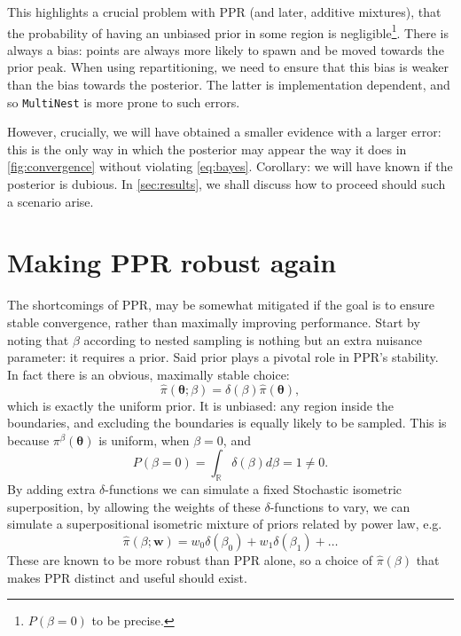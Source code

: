 \documentclass[usenatbib]{mnras}
\begin{document}
This highlights a crucial problem with PPR (and later, additive
mixtures), that the probability of having an unbiased prior in some
region is negligible\footnote{ \(P(\beta=0)\) to be precise.}. There is
always a bias: points are always more likely to spawn and be moved
towards the prior peak. When using repartitioning, we need to ensure
that this bias is weaker than the bias towards the posterior. The
latter is implementation dependent, and so \texttt{MultiNest} is more
prone to such errors.

However, crucially, we will have obtained a smaller evidence with a
larger error: this is the only way in which the posterior may appear
the way it does in \cref{fig:convergence} without violating
\cref{eq:bayes}. Corollary: we will have known if the posterior is
dubious. In \cref{sec:results}, we shall discuss how to proceed should
such a scenario arise.

\section{Making PPR robust again}
The shortcomings of PPR, may be somewhat mitigated if the goal is to
ensure stable convergence, rather than maximally improving
performance. Start by noting that $\beta$ according to nested sampling
is nothing but an extra nuisance parameter: it requires a prior. Said
prior plays a pivotal role in PPR's stability. In fact there is an
obvious, maximally stable choice:
\begin{equation}
  \label{}
\hat{\pi}(\bm{\theta}; \beta) = \delta(\beta) \hat{\pi}(\bm{\theta}), 
\end{equation}
which is exactly the uniform prior. It is unbiased: any region inside
the boundaries, and excluding the boundaries is equally likely to be
sampled. This is because $\pi^{\beta}(\bm{\theta})$ is uniform, when $\beta=0$, and
\begin{equation}\label{eq:PPR-uniform}
P(\beta=0) = \int_{\mathbb{R}} \delta(\beta) d\beta = 1 \ne 0. 
\end{equation}
By adding extra $\delta$-functions we can simulate a fixed Stochastic
isometric superposition, by allowing the weights of these
$\delta$-functions to vary, we can simulate a superpositional
isometric mixture of priors related by power law, e.g.
\begin{equation}
  \label{}
  \hat{\pi}(\beta; \bm{w}) = w_{0}\delta(\beta_{0}) + w_{1}\delta(\beta_{1})+\ldots
\end{equation}
These are known to be more robust than PPR alone, so a choice of
$\hat{\pi}(\beta)$ that makes PPR distinct and useful should exist.
\end{document}
